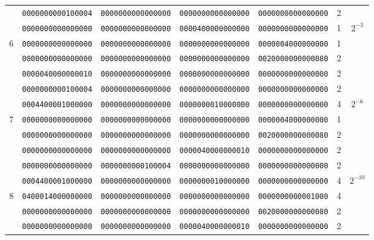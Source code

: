 \begin{table}[!tb]
\begin{center}
{\begin{tabular}{ccccccc}
      & {\tt 0000000000100004} & {\tt 0000000000000000} & {\tt 0000000000000000} & {\tt 0000000000000000} & 2  & \\
      & {\tt 0000000000000000} & {\tt 0000000000000000} & {\tt 0000400000000000} & {\tt 0000000000000000} & 1  & \multirow{3}{*}{$2^{-3}$}\\
6     & {\tt 0000000000000000} & {\tt 0000000000000000} & {\tt 0000000000000000} & {\tt 0000004000000000} & 1 & \\
      & {\tt 0000000000000000} & {\tt 0000000000000000} & {\tt 0000000000000000} & {\tt 0020000000000080} & 2  & \\
      & {\tt 0000040000000010} & {\tt 0000000000000000} & {\tt 0000000000000000} & {\tt 0000000000000000} & 2  & \\ \hline

      & {\tt 0000000000100004} & {\tt 0000000000000000} & {\tt 0000000000000000} & {\tt 0000000000000000} & 2  & \\
      & {\tt 0004400001000000} & {\tt 0000000000000000} & {\tt 0000000010000000} & {\tt 0000000000000000} & 4  & \multirow{3}{*}{$2^{-6}$}\\
7     & {\tt 0000000000000000} & {\tt 0000000000000000} & {\tt 0000000000000000} & {\tt 0000004000000000} & 1  & \\
      & {\tt 0000000000000000} & {\tt 0000000000000000} & {\tt 0000000000000000} & {\tt 0020000000000080} & 2  & \\
      & {\tt 0000000000000000} & {\tt 0000000000000000} & {\tt 0000040000000010} & {\tt 0000000000000000} & 2  & \\ \hline

      & {\tt 0000000000000000} & {\tt 0000000000100004} & {\tt 0000000000000000} & {\tt 0000000000000000} & 2  & \\
      & {\tt 0004400001000000} & {\tt 0000000000000000} & {\tt 0000000010000000} & {\tt 0000000000000000} & 4  & \multirow{3}{*}{$2^{-10}$}\\
8     & {\tt 0400014000000000} & {\tt 0000000000000000} & {\tt 0000000000000000} & {\tt 0000000000001000} & 4  & \\
      & {\tt 0000000000000000} & {\tt 0000000000000000} & {\tt 0000000000000000} & {\tt 0020000000000080} & 2  & \\
      & {\tt 0000000000000000} & {\tt 0000000000000000} & {\tt 0000040000000010} & {\tt 0000000000000000} & 2  & \\ \hline


\end{tabular}}
\end{center}
\end{table}
